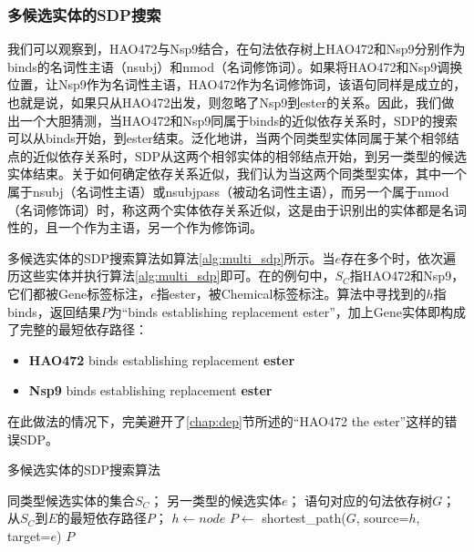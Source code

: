 \documentclass[twocolumn]{article}
\begin{document}
\subsubsection{多候选实体的SDP搜索}
我们可以观察到，HAO472与Nsp9结合，在句法依存树上HAO472和Nsp9分别作为binds的名词性主语（nsubj）和nmod（名词修饰词）。如果将HAO472和Nsp9调换位置，让Nsp9作为名词性主语，HAO472作为名词修饰词，该语句同样是成立的，也就是说，如果只从HAO472出发，则忽略了Nsp9到ester的关系。因此，我们做出一个大胆猜测，当HAO472和Nsp9同属于binds的近似依存关系时，SDP的搜索可以从binds开始，到ester结束。泛化地讲，当两个同类型实体同属于某个相邻结点的近似依存关系时，SDP从这两个相邻实体的相邻结点开始，到另一类型的候选实体结束。关于如何确定依存关系近似，我们认为当这两个同类型实体，其中一个属于nsubj（名词性主语）或nsubjpass（被动名词性主语），而另一个属于nmod（名词修饰词）时，称这两个实体依存关系近似，这是由于识别出的实体都是名词性的，且一个作为主语，另一个作为修饰词。\par
多候选实体的SDP搜索算法如算法\ref{alg:multi_sdp}所示。当$e$存在多个时，依次遍历这些实体并执行算法\ref{alg:multi_sdp}即可。在\cite{hao472}的例句中，$S_C$指HAO472和Nsp9，它们都被Gene标签标注，$e$指ester，被Chemical标签标注。算法中寻找到的$h$指binds，返回结果$P$为“binds establishing replacement ester”，加上Gene实体即构成了完整的最短依存路径：\par
\begin{itemize}
	\item \textbf{HAO472} binds establishing replacement \textbf{ester}
	\item \textbf{Nsp9} binds establishing replacement \textbf{ester}
\end{itemize}\par
在此做法的情况下，完美避开了\ref{chap:dep}节所述的“HAO472 the ester”这样的错误SDP。\par

\renewcommand{\algorithmicrequire}{\textbf{Input:}}
\renewcommand{\algorithmicensure}{\textbf{Output:}}

\begin{algorithm}[htb]
	\caption{多候选实体的SDP搜索算法}
	\label{alg:multi_sdp}
	\begin{algorithmic}[1]
		\REQUIRE
		同类型候选实体的集合$S_C$；
		另一类型的候选实体$e$；
		语句对应的句法依存树$G$；
		\ENSURE
		从$S_C$到$E$的最短依存路径$P$；
		\STATE $h \gets node$
		\ENDIF
		\ENDFOR
		\STATE $P \gets$ shortest\_path($G$, source=$h$, target=$e$) 
		\ENDIF
		\RETURN $P$
	\end{algorithmic} 
\end{algorithm}
\end{document}
